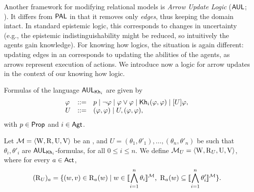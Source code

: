 
Another framework for modifying relational models is \emph{Arrow Update Logic} ($\mathsf{AUL}$; \cite{KooiR11}). It differs from $\textsf{PAL}$ in that it removes only \emph{edges}, thus keeping the domain intact. In standard epistemic logic, this corresponds to changes in uncertainty (e.g., the epistemic indistinguishability might be reduced, so intuitively the agents gain knowledge). For knowing how logics, the situation is again different: updating edges in an \lts corresponds to updating the abilities of the agents, as arrows represent execution of actions. We introduce now a logic for arrow updates in the context of our knowing how logic.

\medskip 

\begin{definition}\label{def:arrowsyntax}
Formulas of the language $\mathsf{AUL}_{{\sf Kh}_i}$ are given by
\[
\begin{array}{lcl}
\varphi & ::= & p \mid \neg\varphi \mid \varphi\vee\varphi \mid
{\sf Kh}_i(\varphi,\varphi) \mid [U]\varphi, \\
U & ::= & (\varphi,\varphi) \mid U,(\varphi,\varphi),
\end{array}
\]
with $p \in {\rm \sf Prop}$ and $i\in{\rm \sf Agt}$. 
\end{definition}

\medskip 

\begin{definition}
Let $\mathcal{M} = \langle \operatorname{W}, \operatorname{R}, \operatorname{U}, \operatorname{V} \rangle$ be an \ults, and $U = (\theta_1,\theta'_1),\dots,(\theta_n,\theta'_n)$ be such that $\theta_i,\theta'_i$ are $\mathsf{AUL}_{{\sf Kh}_i}$-formulas, for all $0\leq i \leq n$. We define $\mathcal{M}_{{U}} = \langle \operatorname{W}, \operatorname{R}_{{U}}, \operatorname{U},\operatorname{V} \rangle$, where for every $a\in{\rm \sf Act}$,
\[
	(\operatorname{R}_{{U}})_a = \{ (w,v) \in \operatorname{R}_a(w) \mid w \in \llbracket \bigwedge_{i=1}^n \theta_i \rrbracket^{\mathcal{M}} \text{, } \operatorname{R}_a(w) \subseteq \llbracket \bigwedge_{i=1}^n \theta'_i \rrbracket^{\mathcal{M}} \}.
\]
\end{definition}

